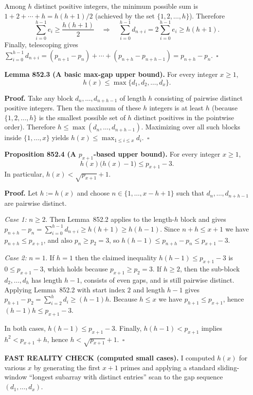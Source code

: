 Among $h$ distinct positive integers, the minimum possible sum is $1+2+\cdots+h = h(h+1)/2$ (achieved by the set $\{1,2,\dots,h\}$). Therefore
\[
  \sum_{i=0}^{h-1} e_i \ge \frac{h(h+1)}{2}
  \quad\Rightarrow\quad
  \sum_{i=0}^{h-1} d_{n+i} = 2\sum_{i=0}^{h-1} e_i \ge h(h+1).
\]
Finally, telescoping gives $\sum_{i=0}^{h-1} d_{n+i} = (p_{n+1}-p_n)+\cdots+(p_{n+h}-p_{n+h-1})=p_{n+h}-p_n$.\ $\square$

\medskip
\textbf{Lemma 852.3 (A basic max-gap upper bound).}
For every integer $x\ge 1$,
\[
  h(x) \le \max\{d_1,d_2,\dots,d_x\}.
\]

\textbf{Proof.}
Take any block $d_n,\dots,d_{n+h-1}$ of length $h$ consisting of pairwise distinct positive integers. Then the maximum of these $h$ integers is at least $h$ (because $\{1,2,\dots,h\}$ is the smallest possible set of $h$ distinct positives in the pointwise order). Therefore $h\le \max(d_n,\dots,d_{n+h-1})$. Maximizing over all such blocks inside $\{1,\dots,x\}$ yields $h(x)\le \max_{1\le i\le x} d_i$.\ $\square$

\medskip
\textbf{Proposition 852.4 (A $p_{x+1}$-based upper bound).}
For every integer $x\ge 1$,
\[
  h(x)\bigl(h(x)-1\bigr) \le p_{x+1}-3.
\]
In particular, $h(x) < \sqrt{p_{x+1}}+1$.

\textbf{Proof.}
Let $h:=h(x)$ and choose $n\in\{1,\dots,x-h+1\}$ such that $d_n,\dots,d_{n+h-1}$ are pairwise distinct.

\emph{Case 1:} $n\ge 2$. Then Lemma~852.2 applies to the length-$h$ block and gives
$p_{n+h}-p_n=\sum_{i=0}^{h-1} d_{n+i}\ge h(h+1)\ge h(h-1)$. Since $n+h\le x+1$ we have $p_{n+h}\le p_{x+1}$, and also $p_n\ge p_2=3$, so
$h(h-1)\le p_{n+h}-p_n \le p_{x+1}-3$.

\emph{Case 2:} $n=1$. If $h=1$ then the claimed inequality $h(h-1)\le p_{x+1}-3$ is $0\le p_{x+1}-3$, which holds because $p_{x+1}\ge p_2=3$. If $h\ge 2$, then the sub-block $d_2,\dots,d_h$ has length $h-1$, consists of even gaps, and is still pairwise distinct. Applying Lemma~852.2 with start index $2$ and length $h-1$ gives
$p_{h+1}-p_2=\sum_{i=2}^{h} d_i\ge (h-1)h$. Because $h\le x$ we have $p_{h+1}\le p_{x+1}$, hence $(h-1)h\le p_{x+1}-3$.

In both cases, $h(h-1)\le p_{x+1}-3$. Finally, $h(h-1)<p_{x+1}$ implies $h^2<p_{x+1}+h$, hence $h<\sqrt{p_{x+1}}+1$.\ $\square$


\medskip
\textbf{FAST REALITY CHECK (computed small cases).}
I computed $h(x)$ for various $x$ by generating the first $x+1$ primes and applying a standard sliding-window ``longest subarray with distinct entries'' scan to the gap sequence $(d_1,\dots,d_x)$.

